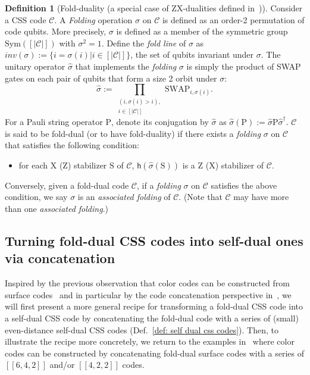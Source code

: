 \documentclass[reprint,aps,twocolumn,superscriptaddress,showpacs,notitlepage,10pt]{revtex4-2}
\theoremstyle{definition}
\newtheorem{definition}[theorem]{Definition}
\begin{document}
\begin{definition}[Fold-duality (a special case of ZX-dualities defined in~\cite{breuckmann_fold-transversal_2024})] \label{def: fold duality}
     Consider a CSS code $\mathcal{C}$. A \textit{Folding} operation $\sigma$ on $\mathcal{C}$ is defined as an order-2 permutation of code qubits. More precisely, $\sigma$ is defined as a member of the symmetric group $\mathrm{Sym}([|\mathcal{C}|])$ with $\sigma^2=1$. Define the \textit{fold line} of $\sigma$ as $inv(\sigma):=\{i=\sigma(i)|i\in [|\mathcal{C}|]\}$, the set of qubits invariant under $\sigma$.  The unitary operator $\hat{\sigma}$ that implements the \textit{folding} $\sigma$ is simply the product of SWAP gates on each pair of qubits that form a size 2 orbit under $\sigma$:
    \[
   \hat{\sigma}:= \prod_{\substack{(i,\sigma(i)> i), \\i\in[|\mathcal{C}|]}}  \mathrm{SWAP}_{i,\sigma(i)}.
    \]
For a Pauli string operator $\mathrm{P}$, denote its conjugation by $\hat{\sigma}$ as $\hat{\sigma}(\mathrm{P}):=\hat{\sigma}\mathrm{P}\hat{\sigma}^{\dagger}$. 
$\mathcal{C}$ is said to be fold-dual (or to have fold-duality) if there exists a \textit{folding} $\sigma$ on $\mathcal{C}$ that satisfies the following condition: 
\begin{itemize}
\item for each $\mathrm{X}$ ($\mathrm{Z}$) stabilizer $\mathrm{S}$ of $\mathcal{C}$, $\mathsf{h}(\hat{\sigma}(\mathrm{S}))$ is a $\mathrm{Z}$ ($\mathrm{X}$) stabilizer of $\mathcal{C}$. 
\end{itemize}
Conversely, given a fold-dual code $\mathcal{C}$, if a \textit{folding} $\sigma$ on $\mathcal{C}$ satisfies the above condition, we say $\sigma$ is an \textit{associated folding} of $\mathcal{C}$. (Note that $\mathcal{C}$ may have more than one \textit{associated folding}.) 
 \end{definition}


\subsection{Turning fold-dual CSS codes into self-dual ones via concatenation}\label{subsec: transforming fold-dual codes into self-dual codes via concatenation}
Inspired by the previous observation that color codes can be constructed from surface codes~\cite{bombin_universal_2012,kubica_unfolding_2015,criger_concatenated_toric_code_2016} and in particular by the code concatenation perspective in~\cite{criger_concatenated_toric_code_2016}, we will first present a more general recipe for transforming a fold-dual CSS code into a self-dual CSS code by concatenating the fold-dual code with a series of (small) even-distance self-dual CSS codes (Def.~\ref{def: self dual css codes}). Then, to illustrate the recipe more concretely, we return to the examples in~\cite{criger_concatenated_toric_code_2016} where color codes can be constructed by concatenating fold-dual surface codes with a series of $[[6,4,2]]$ and/or $[[4,2,2]]$ codes.    
\end{document}
